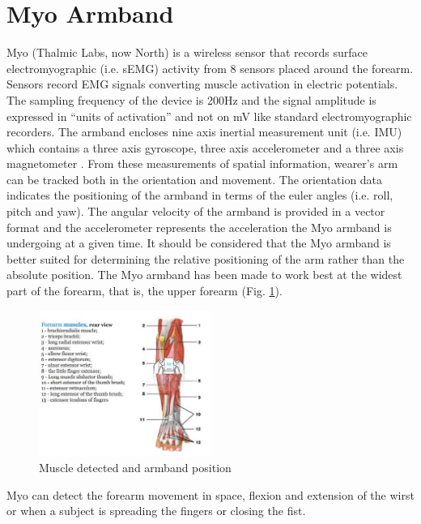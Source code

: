 \documentclass{vgtc}
\begin{document}
\section{Myo Armband}
Myo (Thalmic Labs, now North) is a wireless sensor that records surface electromyographic (i.e. sEMG) activity from 8 sensors placed around the forearm. Sensors record EMG signals converting muscle activation in electric potentials. The sampling frequency of the device is 200Hz and the signal amplitude is expressed in “units of activation” and not on mV like standard electromyographic recorders. The armband encloses nine axis inertial measurement unit (i.e. IMU) which contains a three axis gyroscope, three axis accelerometer and a three axis magnetometer \cite{myowebsite}. From these measurements of spatial information, wearer’s arm can be tracked both in the orientation and movement. The orientation data indicates the positioning of the armband in terms of the euler angles (i.e. roll, pitch and yaw). The angular velocity of the armband is provided in a vector format and the accelerometer represents the acceleration the Myo armband is undergoing at a given time. It should be considered that the Myo armband is better suited for determining the relative positioning of the arm rather than the absolute position. The Myo armband has been made to work best at the widest part of the forearm, that is, the upper forearm (Fig. \ref{fig:arm1}).
\begin{figure}[h]
\includegraphics[width=0.5\textwidth]{myo_armband_muscles}
\caption{Muscle detected and armband position}
\centering
\label{fig:arm1}
\end{figure}
Myo can detect the forearm movement in space, flexion and extension of the wirst or when a subject is spreading the fingers or closing the fist. 
\end{document}
